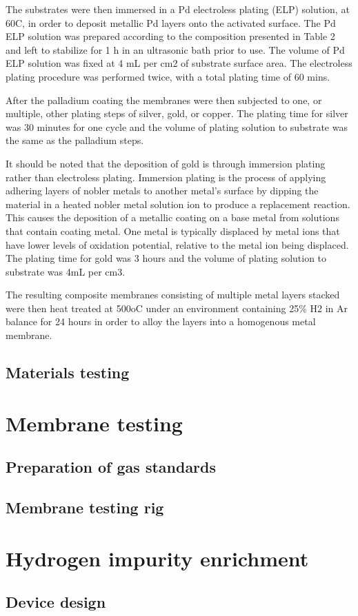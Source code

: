 The substrates were then immersed in a Pd electroless plating (ELP) solution, at 60\textdegree C, 
in order to deposit metallic Pd layers onto the activated surface. The Pd ELP solution was 
prepared according to the composition presented in Table 2 and left to stabilize for 1 h in an 
ultrasonic bath prior to use. The volume of Pd ELP solution was fixed at 4 mL per cm2 of 
substrate surface area. The electroless plating procedure was performed twice, with a total 
plating time of 60 mins.

After the palladium coating the membranes were then subjected to one, or multiple, other 
plating steps of silver, gold, or copper. The plating time for silver was 30 minutes for one 
cycle and the volume of plating solution to substrate was the same as the palladium steps.

It should be noted that the deposition of gold is through immersion plating rather than 
electroless plating. Immersion plating is the process of applying adhering layers of nobler 
metals to another metal's surface by dipping the material in a heated nobler metal solution 
ion to produce a replacement reaction. This causes the deposition of a metallic coating on a 
base metal from solutions that contain coating metal. One metal is typically displaced by 
metal ions that have lower levels of oxidation potential, relative to the metal ion being 
displaced. The plating time for gold was 3 hours and the volume of plating solution to 
substrate was 4mL per cm3.

The resulting composite membranes consisting of multiple metal layers stacked were then heat 
treated at 500oC under an environment containing 25\% H2 in Ar balance for 24 hours in order 
to alloy the layers into a homogenous metal membrane.

\subsection{Materials testing}

\section{Membrane testing}
\subsection{Preparation of gas standards}
\subsection{Membrane testing rig}

\section{Hydrogen impurity enrichment}
\subsection{Device design}

\renewcommand{\bibname}{References}

